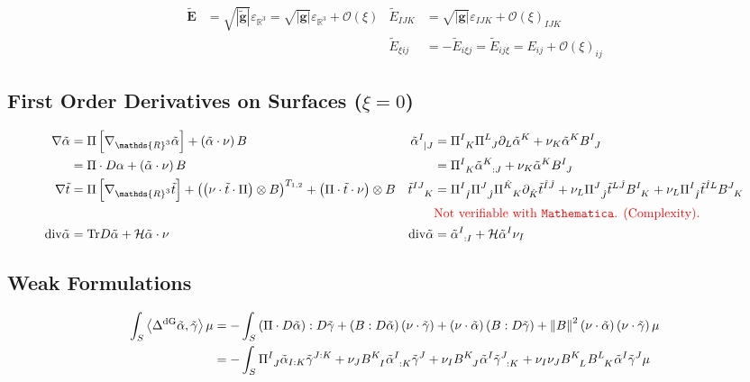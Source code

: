 \documentclass[a4paper,10pt]{scrartcl}
\newcommand{\R}{\mathds{R}}
\newcommand{\mean}{\mathcal{H}}
\newcommand{\Tr}{\mathrm{Tr}}
\renewcommand{\div}{\mathrm{div}}
\newcommand{\laplace}[1]{\Delta^{#1}}
\newcommand{\ldivgrad}{\laplace{\textup{dG}}}
\newcommand{\gb}{\mathbf{g}}
\newcommand{\Eb}{\mathbf{E}}
\newcommand{\pism}{\Pi}
\newcommand{\pis}[1]{\pism\left[ #1 \right]}
\newcommand{\pissf}[2]{\tensor{\pism}{^{#1}_{#2}}}
\newcommand{\bsf}[2]{\tensor{B}{^{#1}_{#2}}}
\newcommand{\landau}{\mathcal{O}}
\newcommand{\landauo}{\landau\left( \xi \right)}
\newcommand{\ints}[1]{\int_{S} #1 \mu}
\newcommand{\talpha}{\tilde{\alpha}}
\begin{document}
  \begin{align*}
    \tilde{\Eb} &= \sqrt{\left| \tilde{\gb} \right|}\varepsilon_{\R^{3}} = \sqrt{\left| \gb \right|}\varepsilon_{\R^{3}} + \landauo
          &\tilde{E}_{IJK} &= \sqrt{\left| \gb \right|}\varepsilon_{IJK} + \landauo_{IJK}\\
         &&\tilde{E}_{\xi i j} &= -\tilde{E}_{i \xi j} = \tilde{E}_{i j \xi} = E_{ij} + \landauo_{ij}
  \end{align*}

  \subsection{First Order Derivatives on Surfaces (\( \xi = 0 \))}
  \begin{align*}
    \nabla\tilde{\alpha} &= \pis{\nabla_{\R^{3}}\tilde{\alpha}} + \left( \tilde{\alpha}\cdot\nu \right) B
          &\tensor{\tilde{\alpha}}{^{I}_{|J}} &= \pissf{I}{K}\pissf{L}{J}\partial_{L}\tilde{\alpha}^{K} + \nu_{K}\tilde{\alpha}^{K}\bsf{I}{J} \\
           &= \pism\cdot D\alpha + \left( \tilde{\alpha}\cdot\nu \right) B
                                              &&= \pissf{I}{K}\tensor{\tilde{\alpha}}{^{K}_{:J}} + \nu_{K}\tilde{\alpha}^{K}\bsf{I}{J}\\
    \nabla\tilde{t} &= \pis{\nabla_{\R^{3}}\tilde{t}} + \left( \left( \nu\cdot\tilde{t}\cdot\pism \right)\otimes B \right)^{T_{1,2}} 
                                                     + \left( \pism\cdot\tilde{t}\cdot\nu \right)\otimes B
          &\tensor{\tilde{t}}{^{IJ}_{K}} &= \pissf{I}{\hat{I}}\pissf{J}{\hat{J}}\pissf{\hat{K}}{K}\partial_{\hat{K}}\tilde{t}^{\hat{I}\hat{J}}
                                            + \nu_{L}\pissf{J}{\hat{J}}\tilde{t}^{L\hat{J}}\bsf{I}{K} + \nu_{L}\pissf{I}{\hat{I}}\tilde{t}^{\hat{I}L}\bsf{J}{K}\\
                        &&&{\color{red}\text{Not verifiable with \texttt{Mathematica}. (Complexity)}.}\\
   \div\talpha &= \Tr D\talpha + \mean \talpha\cdot\nu
          & \div\talpha &= \tensor{\talpha}{^{I}_{:I}} + \mean \talpha^{I}\nu_{I}
  \end{align*}

  \subsection{Weak Formulations}
  \begin{align*}
    \ints{\left\langle \ldivgrad\tilde{\alpha} , \tilde{\gamma} \right\rangle}
        &= -\ints{\left( \pism\cdot D\tilde{\alpha} \right):D\tilde{\gamma} + \left( B:D \tilde{\alpha} \right)\left( \nu\cdot\tilde{\gamma} \right)
            +\left( \nu\cdot\tilde{\alpha} \right)\left( B: D \tilde{\gamma} \right) + \left\| B \right\|^{2}\left( \nu\cdot\tilde{\alpha} \right)\left( \nu\cdot\tilde{\gamma} \right)} \\
        &= -\ints{\pissf{I}{J}\tilde{\alpha}_{I:K}\tilde{\gamma}^{J:K}  +  \nu_{J}\bsf{K}{I}\tensor{\tilde{\alpha}}{^{I}_{:K}}\tilde{\gamma}^{J}
                +  \nu_{I}\bsf{K}{J}\tilde{\alpha}^{I}\tensor{\tilde{\gamma}}{^{J}_{:K}}
                +  \nu_{I}\nu_{J}\bsf{K}{L}\bsf{L}{K}\tilde{\alpha}^{I}\tilde{\gamma}^{J}}
  \end{align*}
\end{document}
